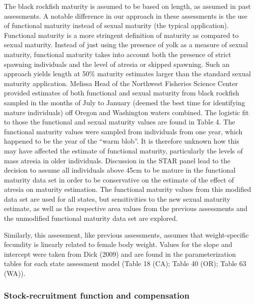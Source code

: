 \documentclass[11pt,
  english,
  letterpaper,
]{article}
\begin{document}
The black rockfish maturity is assumed to be based on length, as assumed in past assessments. A notable difference in our approach in these assessments is the use of functional maturity instead of sexual maturity (the typical application). Functional maturity is a more stringent definition of maturity as compared to sexual maturity. Instead of just using the presence of yolk as a measure of sexual maturity, functional maturity takes into account both the presence of strict spawning individuals and the level of atresia or skipped spawning. Such an approach yields length at 50\% maturity estimates larger than the standard sexual maturity application. Melissa Head of the Northwest Fisheries Science Center provided estimates of both functional and sexual maturity from black rockfish sampled in the months of July to January (deemed the best time for identifying mature individuals) off Oregon and Washington waters combined. The logistic fit to those the functional and sexual maturity values are found in Table 4. The functional maturity values were sampled from individuals from one year, which happened to be the year of the ``warm blob''. It is therefore unknown how this may have affected the estimate of functional maturity, particularly the levels of mass atresia in older individuals. Discussion in the STAR panel lead to the decision to assume all individuals above 45cm to be mature in the functional maturity data set in order to be conservative on the estimate of the effect of atresia on maturity estimation. The functional maturity values from this modified data set are used for all states, but sensitivities to the new sexual maturity estimate, as well as the respective area values from the previous assessments and the unmodified functional maturity data set are explored.

Similarly, this assessment, like previous assessments, assumes that weight-specific fecundity is linearly related to female body weight. Values for the slope and intercept were taken from Dick (2009) and are found in the parameterization tables for each state assessment model (Table 18 (CA); Table 40 (OR); Table 63 (WA)).

\hypertarget{stock-recruitment-function-and-compensation}{%
\subsubsection{Stock-recruitment function and compensation}\label{stock-recruitment-function-and-compensation}}
\end{document}
